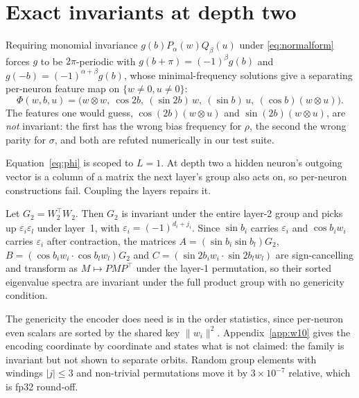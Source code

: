 \section{Exact invariants at depth two}\label{sec:invariants}

Requiring monomial invariance $g(b)P_\alpha(w)Q_\beta(u)$ under \eqref{eq:normalform} forces $g$ to
be $2\pi$-periodic with $g(b+\pi) = (-1)^\beta g(b)$ and $g(-b)=(-1)^{\alpha+\beta}g(b)$, whose
minimal-frequency solutions give a separating per-neuron feature map on $\{w\neq0,u\neq0\}$:
\begin{equation}
\Phi(w,b,u) = \big(w\otimes w,\ \cos 2b,\ (\sin 2b)\,w,\ (\sin b)\,u,\ (\cos b)(w\otimes u)\big).
\label{eq:phi}
\end{equation}
The features one would guess, $\cos(2b)(w\otimes u)$ and $\sin(2b)(w\otimes u)$, are \emph{not}
invariant: the first has the wrong bias frequency for $\rho$, the second the wrong parity for
$\sigma$, and both are refuted numerically in our test suite.

Equation~\eqref{eq:phi} is scoped to $L=1$. At depth two a hidden neuron's outgoing vector is a
column of a matrix the next layer's group also acts on, so per-neuron constructions fail. Coupling
the layers repairs it.

\begin{proposition}[Exact $L=2$ invariant encoding]\label{prop:deep}
Let $G_2 = W_2^\top W_2$. Then $G_2$ is invariant under the entire layer-2 group and picks up
$\varepsilon_i \varepsilon_l$ under layer~1, with $\varepsilon_i = (-1)^{d_i + j_i}$. Since
$\sin b_i$ carries $\varepsilon_i$ and $\cos b_i w_i$ carries $\varepsilon_i$ after contraction, the
matrices $A = (\sin b_i \sin b_l)G_2$, $B = (\cos b_i w_i \cdot \cos b_l w_l)G_2$ and
$C = (\sin 2b_i w_i \cdot \sin 2b_l w_l)$ are sign-cancelling and transform as
$M \mapsto P M P^\top$ under the layer-1 permutation, so their sorted eigenvalue spectra are
invariant under the full product group with no genericity condition.
\end{proposition} The genericity the encoder does need is in the order statistics, since per-neuron even scalars are
sorted by the shared key $\|w_i\|^2$. Appendix~\ref{app:w10} gives the encoding coordinate by
coordinate and states what is not claimed: the family is invariant but not shown to separate orbits.
Random group elements with windings $|j|\le3$ and non-trivial permutations move it by
$3\times10^{-7}$ relative, which is fp32 round-off.
